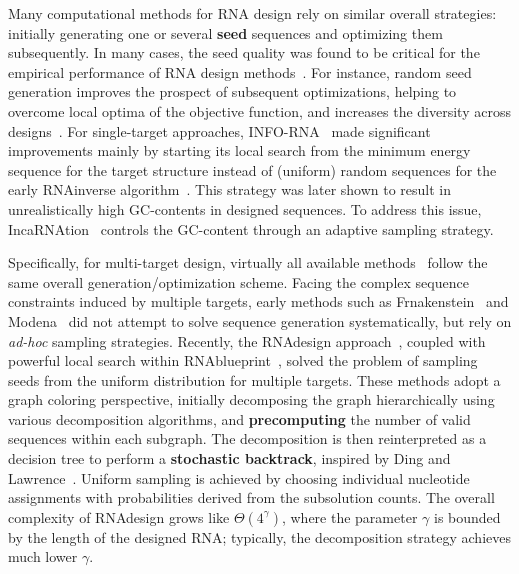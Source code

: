 \documentclass{bioinfo}
\newcommand{\Def}[1]{{\bfseries #1}}
\newcommand{\parHead}[1]{\Final{\paragraph{#1}}}
\newcommand{\Final}[1]{#1}
\renewcommand{\Final}[1]{}
\newcommand{\Nuc}[1]{{\sf #1}}
\newcommand{\Cb}{\Nuc{C}}
\newcommand{\Gb}{\Nuc{G}}
\newcommand{\GCb}{\Gb\Cb}
\newcommand{\Software}[1]{{\ttfamily #1}}
\begin{document}
\parHead{On the importance of sampling for design.}
Many computational methods for RNA design rely on similar overall
strategies: initially generating one or several \Def{seed} sequences
and optimizing them subsequently. In many cases, the seed quality was
found to be critical for the empirical performance of RNA design
methods~\citep{Levin2012}. For instance, random seed generation
improves the prospect of subsequent optimizations, helping to overcome
local optima of the objective function, and increases the diversity
across designs~\citep{Reinharz2013}.  For single-target approaches,
\Software{INFO-RNA}~\citep{Busch2006} made significant improvements
mainly by starting its local search from the minimum energy sequence
for the target structure instead of (uniform) random sequences for the
early \Software{RNAinverse} algorithm~\citep{Hofacker1994}. This
strategy was later shown to result in unrealistically high
\GCb-contents in designed sequences. To address this issue,
\Software{IncaRNAtion}~\citep{Reinharz2013} controls the \GCb-content
through an adaptive sampling strategy.

\parHead{Specificities and similarities of multi-target design.}
Specifically, for multi-target design, virtually all available methods~\citep{Lyngsoe2012,HoenerzuSiederdissen2013,Taneda2015,Hammer2017} follow the same overall generation/optimization scheme.
%
Facing the complex sequence constraints induced by multiple targets, early methods such as \Software{Frnakenstein}~\citep{Lyngsoe2012} and \Software{Modena}~\citep{Taneda2015} did not attempt to solve sequence generation systematically, but rely on \emph{ad-hoc} sampling strategies.
%
Recently, the \Software{RNAdesign}
approach~\citep{HoenerzuSiederdissen2013}, coupled with powerful local
search within \Software{RNAblueprint}~\citep{Hammer2017}, solved the
problem of sampling seeds from the uniform distribution for multiple
targets. These methods adopt a graph coloring perspective, initially
decomposing the graph hierarchically using various decomposition
algorithms, and \Def{precomputing} the number of valid sequences
within each subgraph. The decomposition is then reinterpreted as a
decision tree to perform a \Def{stochastic backtrack}, inspired by
Ding and Lawrence~\citep{Ding2003}. Uniform sampling is achieved by
choosing individual nucleotide assignments with probabilities derived
from the subsolution counts. The overall complexity of
\Software{RNAdesign} grows like $\Theta(4^{\gamma})$, where the
parameter $\gamma$ is bounded by the length of the designed RNA;
typically, the decomposition strategy achieves much lower $\gamma$.
\end{document}
